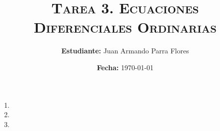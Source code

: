 \documentclass[11pt]{article}
\title{
    \textsc{
        \textbf{Tarea 3.} Ecuaciones Diferenciales Ordinarias
    }
}
\author{
    \textbf{Estudiante:} Juan Armando Parra Flores
}
\date{
    \textbf{Fecha:} \today
}
\begin{document}
    \maketitle

    \begin{enumerate}
        \item
            
            \pagebreak
        \item
            
            \pagebreak
        \item
            
    \end{enumerate}

\end{document}
